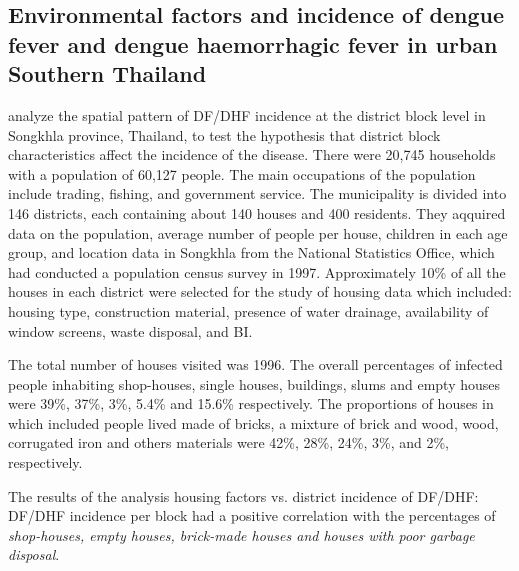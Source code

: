 \documentclass[review]{elsarticle}
\begin{document}
\subsection{Environmental factors and incidence of dengue fever and dengue haemorrhagic fever in urban Southern Thailand}

\cite{thammapalo2008environmental} analyze the spatial pattern of DF/DHF incidence at the district block level in Songkhla province, Thailand, to test the hypothesis that district block characteristics affect the incidence of the disease. There were 20,745 households with a population of 60,127 people. The main occupations of the population include trading, fishing, and government service. The municipality is divided into 146 districts, each containing about 140 houses and 400 residents. They aqquired data on the population, average number of people per house, children in each age group, and location data in Songkhla from the National Statistics Office, which had conducted a population census survey in 1997. Approximately 10\% of all the houses in each district were selected for the study of housing data which included: housing type, construction material, presence of water drainage, availability of window screens, waste disposal, and BI. 

The total number of houses visited was 1996. The overall percentages of infected people inhabiting shop-houses, single houses, buildings, slums and empty houses were 39\%, 37\%, 3\%, 5.4\% and 15.6\% respectively. The proportions of houses in which included people lived made of bricks, a mixture of brick and wood, wood, corrugated iron and others materials were 42\%, 28\%, 24\%, 3\%, and 2\%, respectively.

The results of the analysis housing factors vs. district incidence of DF/DHF: DF/DHF incidence per block had a positive correlation with the percentages of \textit{shop-houses, empty houses, brick-made houses and houses with poor garbage disposal}.
%
%
\end{document}
